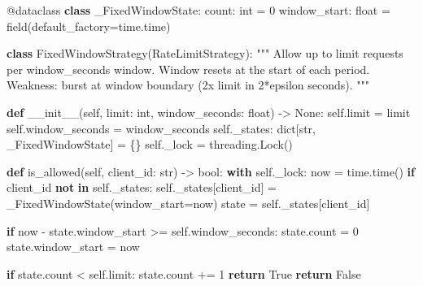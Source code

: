 \documentclass[11pt]{article}
\newenvironment{Shaded}{\begin{snugshade}}{\end{snugshade}}
\newcommand{\AttributeTok}[1]{\textcolor[rgb]{0.16,0.50,0.73}{#1}}
\newcommand{\BuiltInTok}[1]{\textcolor[rgb]{0.50,0.55,0.55}{#1}}
\newcommand{\CommentTok}[1]{\textcolor[rgb]{0.48,0.49,0.49}{#1}}
\newcommand{\ControlFlowTok}[1]{\textcolor[rgb]{0.99,0.74,0.29}{\textbf{#1}}}
\newcommand{\DecValTok}[1]{\textcolor[rgb]{0.96,0.45,0.00}{#1}}
\newcommand{\FunctionTok}[1]{\textcolor[rgb]{0.56,0.27,0.68}{#1}}
\newcommand{\KeywordTok}[1]{\textcolor[rgb]{0.81,0.81,0.76}{\textbf{#1}}}
\newcommand{\NormalTok}[1]{\textcolor[rgb]{0.81,0.81,0.76}{#1}}
\newcommand{\OperatorTok}[1]{\textcolor[rgb]{0.81,0.81,0.76}{#1}}
\newcommand{\VariableTok}[1]{\textcolor[rgb]{0.15,0.68,0.68}{#1}}
\begin{document}
\begin{Shaded}
\begin{Highlighting}[]
\AttributeTok{@dataclass}
\KeywordTok{class}\NormalTok{ \_FixedWindowState:}
\NormalTok{    count: }\BuiltInTok{int} \OperatorTok{=} \DecValTok{0}
\NormalTok{    window\_start: }\BuiltInTok{float} \OperatorTok{=}\NormalTok{ field(default\_factory}\OperatorTok{=}\NormalTok{time.time)}


\KeywordTok{class}\NormalTok{ FixedWindowStrategy(RateLimitStrategy):}
    \CommentTok{"""}
\CommentTok{    Allow up to \textasciigrave{}limit\textasciigrave{} requests per \textasciigrave{}window\_seconds\textasciigrave{} window.}
\CommentTok{    Window resets at the start of each period.}
\CommentTok{    Weakness: burst at window boundary (2x limit in 2*epsilon seconds).}
\CommentTok{    """}

    \KeywordTok{def} \FunctionTok{\_\_init\_\_}\NormalTok{(}\VariableTok{self}\NormalTok{, limit: }\BuiltInTok{int}\NormalTok{, window\_seconds: }\BuiltInTok{float}\NormalTok{) }\OperatorTok{{-}\textgreater{}} \VariableTok{None}\NormalTok{:}
        \VariableTok{self}\NormalTok{.limit }\OperatorTok{=}\NormalTok{ limit}
        \VariableTok{self}\NormalTok{.window\_seconds }\OperatorTok{=}\NormalTok{ window\_seconds}
        \VariableTok{self}\NormalTok{.\_states: }\BuiltInTok{dict}\NormalTok{[}\BuiltInTok{str}\NormalTok{, \_FixedWindowState] }\OperatorTok{=}\NormalTok{ \{\}}
        \VariableTok{self}\NormalTok{.\_lock }\OperatorTok{=}\NormalTok{ threading.Lock()}

    \KeywordTok{def}\NormalTok{ is\_allowed(}\VariableTok{self}\NormalTok{, client\_id: }\BuiltInTok{str}\NormalTok{) }\OperatorTok{{-}\textgreater{}} \BuiltInTok{bool}\NormalTok{:}
        \ControlFlowTok{with} \VariableTok{self}\NormalTok{.\_lock:}
\NormalTok{            now }\OperatorTok{=}\NormalTok{ time.time()}
            \ControlFlowTok{if}\NormalTok{ client\_id }\KeywordTok{not} \KeywordTok{in} \VariableTok{self}\NormalTok{.\_states:}
                \VariableTok{self}\NormalTok{.\_states[client\_id] }\OperatorTok{=}\NormalTok{ \_FixedWindowState(window\_start}\OperatorTok{=}\NormalTok{now)}
\NormalTok{            state }\OperatorTok{=} \VariableTok{self}\NormalTok{.\_states[client\_id]}

            \ControlFlowTok{if}\NormalTok{ now }\OperatorTok{{-}}\NormalTok{ state.window\_start }\OperatorTok{\textgreater{}=} \VariableTok{self}\NormalTok{.window\_seconds:}
\NormalTok{                state.count }\OperatorTok{=} \DecValTok{0}
\NormalTok{                state.window\_start }\OperatorTok{=}\NormalTok{ now}

            \ControlFlowTok{if}\NormalTok{ state.count }\OperatorTok{\textless{}} \VariableTok{self}\NormalTok{.limit:}
\NormalTok{                state.count }\OperatorTok{+=} \DecValTok{1}
                \ControlFlowTok{return} \VariableTok{True}
            \ControlFlowTok{return} \VariableTok{False}



\end{Highlighting}
\end{Shaded}
\end{document}
